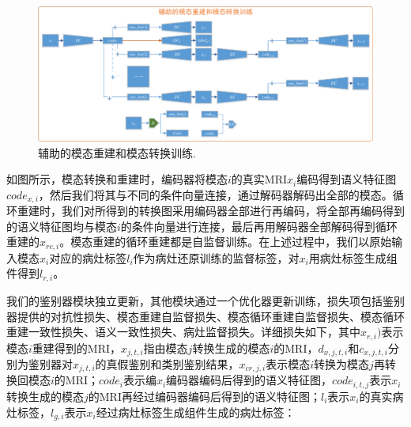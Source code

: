 \documentclass[letterpaper]{article} %
\begin{document}
\begin{figure}
	\centering
	\includegraphics[width=0.98\linewidth]{figures/trans_train}
	\caption{辅助的模态重建和模态转换训练.}
	\label{trans_train}
\end{figure}

如图所示，模态转换和重建时，编码器将模态$i$的真实MRI$x_i$编码得到语义特征图$code_{x,i}$，然后我们将其与不同的条件向量连接，通过解码器解码出全部的模态。循环重建时，我们对所得到的转换图采用编码器全部进行再编码，将全部再编码得到的语义特征图均与模态$i$的条件向量进行连接，最后再用解码器全部解码得到循环重建的$x_{rc,i}$。模态重建的循环重建都是自监督训练。在上述过程中，我们以原始输入模态$x_i$对应的病灶标签$l_i$作为病灶还原训练的监督标签，对$x_i$用病灶标签生成组件得到$l_{r,i}$。

我们的鉴别器模块独立更新，其他模块通过一个优化器更新训练，损失项包括鉴别器提供的对抗性损失、模态重建自监督损失、模态循环重建自监督损失、模态循环重建一致性损失、语义一致性损失、病灶监督损失。详细损失如下，其中$x_{r,i})$表示模态$i$重建得到的MRI，$x_{j,t,i}$指由模态$j$转换生成的模态$i$的MRI，$d_{x,j,t,i}$和$c_{x,j,t,i}$分别为鉴别器对$x_{j,t,i}$的真假鉴别和类别鉴别结果，$x_{cr,j,i}$表示模态$i$转换为模态$j$再转换回模态$i$的MRI；$code_i$表示编$x_i$编码器编码后得到的语义特征图，$code_{i,t,j}$表示$x_i$转换生成的模态$j$的MRI再经过编码器编码后得到的语义特征图；$l_i$表示$x_i$的真实病灶标签，$l_{g,i}$表示$x_i$经过病灶标签生成组件生成的病灶标签：
\end{document}
